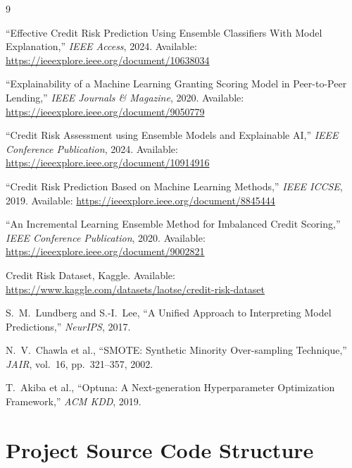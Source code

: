\documentclass[12pt,a4paper]{report}
\begin{document}
\begin{thebibliography}{9}

``Effective Credit Risk Prediction Using Ensemble Classifiers With Model Explanation,''
\textit{IEEE Access}, 2024.
Available: \url{https://ieeexplore.ieee.org/document/10638034}

``Explainability of a Machine Learning Granting Scoring Model in Peer-to-Peer Lending,''
\textit{IEEE Journals \& Magazine}, 2020.
Available: \url{https://ieeexplore.ieee.org/document/9050779}

``Credit Risk Assessment using Ensemble Models and Explainable AI,''
\textit{IEEE Conference Publication}, 2024.
Available: \url{https://ieeexplore.ieee.org/document/10914916}

``Credit Risk Prediction Based on Machine Learning Methods,''
\textit{IEEE ICCSE}, 2019.
Available: \url{https://ieeexplore.ieee.org/document/8845444}

``An Incremental Learning Ensemble Method for Imbalanced Credit Scoring,''
\textit{IEEE Conference Publication}, 2020.
Available: \url{https://ieeexplore.ieee.org/document/9002821}

Credit Risk Dataset, Kaggle.
Available: \url{https://www.kaggle.com/datasets/laotse/credit-risk-dataset}

S.~M.~Lundberg and S.-I.~Lee,
``A Unified Approach to Interpreting Model Predictions,''
\textit{NeurIPS}, 2017.

N.~V.~Chawla et al.,
``SMOTE: Synthetic Minority Over-sampling Technique,''
\textit{JAIR}, vol.~16, pp.~321--357, 2002.

T.~Akiba et al.,
``Optuna: A Next-generation Hyperparameter Optimization Framework,''
\textit{ACM KDD}, 2019.

\end{thebibliography}


\appendix
\chapter{Project Source Code Structure}
\end{document}
